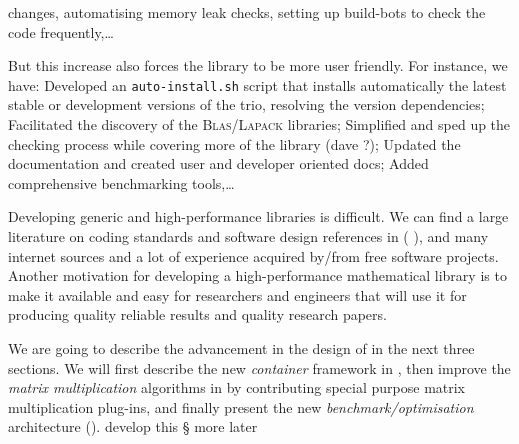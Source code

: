 changes, automatising memory leak checks, setting up build-bots to check the code
frequently,\dots
%
\par
%
But this increase also forces the library to be more user friendly. For
instance, we have:
%
Developed an \texttt{auto-install.sh} script that installs automatically the
latest stable or development versions of the trio, resolving the version
dependencies;
%
Facilitated the discovery of the \textsc{Blas}/\textsc{Lapack} libraries;
%
Simplified and sped up the checking process while covering more of the library
(\danger dave ?);
%
Updated the documentation and created user and developer oriented docs;
%
Added comprehensive benchmarking tools,\dots
%
%
\par
%
Developing generic and high-performance libraries is difficult. We can find a
large literature on coding standards and software design references in (\cf{}
\cite{alexandrescu:01:modern,gamma:95:design,sutter:05:cpp,stroustrup1994design,Douglas:05:GPHP}),
and many internet sources and a lot of experience acquired by/from free
software projects.  Another motivation for developing a high-performance
mathematical library is to make it available and easy for researchers and
engineers that will use it for producing quality reliable results and quality
research papers.
%
\par
%
We are going to describe the advancement in the design of \linbox in the next
three sections. We will first describe the new \emph{container} framework in
, then improve the \emph{matrix multiplication} algorithms
in  by contributing special purpose matrix multiplication
plug-ins, and finally present the new \emph{benchmark/optimisation}
architecture ().
%
\danger develop this § more later
